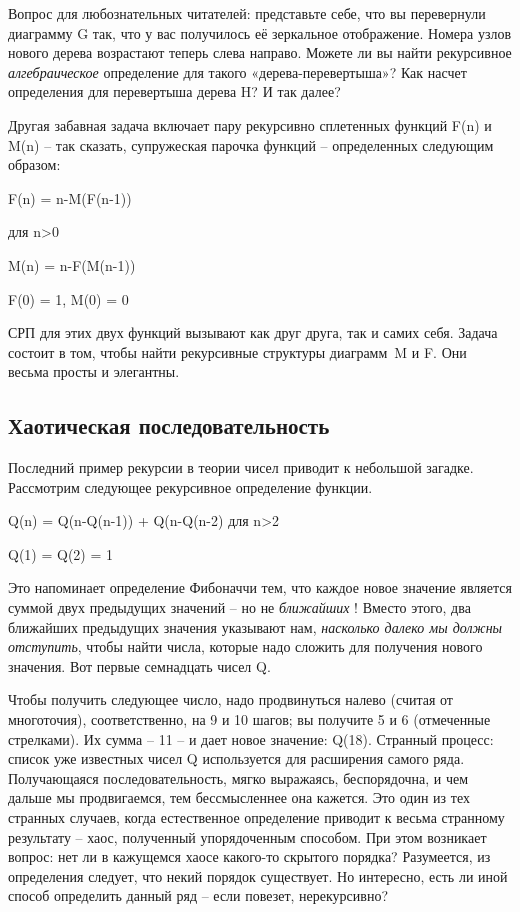 \documentclass[../main.tex]{subfiles}
\begin{document}
Вопрос для любознательных читателей: представьте себе, что вы перевернули диаграмму G так, что у вас получилось её зеркальное отображение. Номера узлов нового дерева возрастают теперь слева направо. Можете ли вы найти рекурсивное \emph{алгебраическое} определение для такого «дерева-перевертыша»? Как насчет определения для перевертыша дерева H? И так далее?

Другая забавная задача включает пару рекурсивно сплетенных функций F(n) и M(n) \--- так сказать, супружеская парочка функций \--- определенных следующим образом:

F(n) = n-M(F(n-1))

для n\textgreater0

M(n) = n-F(M(n-1))

F(0) = 1, M(0) = 0

СРП для этих двух функций вызывают как друг друга, так и самих себя. Задача состоит в том, чтобы найти рекурсивные структуры диаграмм~M и F. Они весьма просты и элегантны.


\subsection{Хаотическая последовательность}

Последний пример рекурсии в теории чисел приводит к небольшой загадке. Рассмотрим следующее рекурсивное определение функции.

Q(n) = Q(n-Q(n-1)) + Q(n-Q(n-2) для n\textgreater2

Q(1) = Q(2) = 1

Это напоминает определение Фибоначчи тем, что каждое новое значение является суммой двух предыдущих значений \--- но не \emph{ближайших} ! Вместо этого, два ближайших предыдущих значения указывают нам, \emph{насколько далеко мы должны отступить}, чтобы найти числа, которые надо сложить для получения нового значения. Вот первые семнадцать чисел Q.

Чтобы получить следующее число, надо продвинуться налево (считая от многоточия), соответственно, на 9 и 10 шагов; вы получите 5 и 6 (отмеченные стрелками). Их сумма \--- 11 \--- и дает новое значение: Q(18). Странный процесс: список уже известных чисел Q используется для расширения самого ряда. Получающаяся последовательность, мягко выражаясь, беспорядочна, и чем дальше мы продвигаемся, тем бессмысленнее она кажется. Это один из тех странных случаев, когда естественное определение приводит к весьма странному результату \--- хаос, полученный упорядоченным способом. При этом возникает вопрос: нет ли в кажущемся хаосе какого-то скрытого порядка? Разумеется, из определения следует, что некий порядок существует. Но интересно, есть ли иной способ определить данный ряд \--- если повезет, нерекурсивно?
\end{document}
